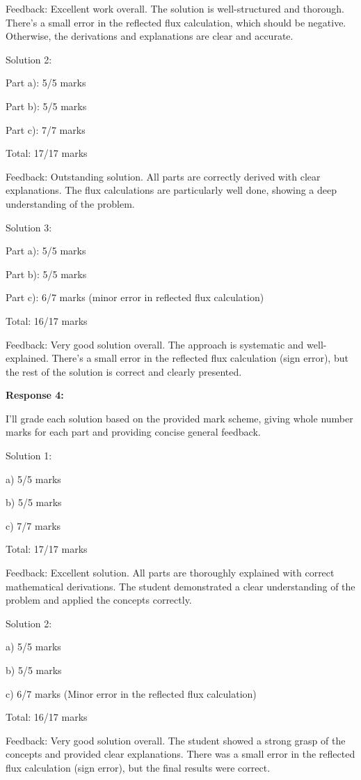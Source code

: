 \documentclass[a4paper,11pt]{article}
\begin{document}
Feedback: Excellent work overall. The solution is well-structured and thorough. There's a small error in the reflected flux calculation, which should be negative. Otherwise, the derivations and explanations are clear and accurate.

Solution 2:

Part a): 5/5 marks

Part b): 5/5 marks

Part c): 7/7 marks

Total: 17/17 marks

Feedback: Outstanding solution. All parts are correctly derived with clear explanations. The flux calculations are particularly well done, showing a deep understanding of the problem.

Solution 3:

Part a): 5/5 marks

Part b): 5/5 marks

Part c): 6/7 marks (minor error in reflected flux calculation)

Total: 16/17 marks

Feedback: Very good solution overall. The approach is systematic and well-explained. There's a small error in the reflected flux calculation (sign error), but the rest of the solution is correct and clearly presented.

\bigskip
\textbf{Response 4:}

I'll grade each solution based on the provided mark scheme, giving whole number marks for each part and providing concise general feedback.

Solution 1:

a) 5/5 marks

b) 5/5 marks

c) 7/7 marks

Total: 17/17 marks

Feedback: Excellent solution. All parts are thoroughly explained with correct mathematical derivations. The student demonstrated a clear understanding of the problem and applied the concepts correctly.

Solution 2:

a) 5/5 marks

b) 5/5 marks

c) 6/7 marks (Minor error in the reflected flux calculation)

Total: 16/17 marks

Feedback: Very good solution overall. The student showed a strong grasp of the concepts and provided clear explanations. There was a small error in the reflected flux calculation (sign error), but the final results were correct.
\end{document}
